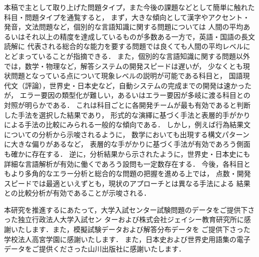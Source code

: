 \documentclass[japanese]{jnlp_1.4b}
\begin{document}
本稿で主として取り上げた問題タイプ，また今後の課題などとして簡単に触れた科目・問題タイプを通覧すると，
まず，大きな傾向として漢字やアクセント・発音，文法問題など，個別的な言語知識に関する問題については
人間の平均あるいはそれ以上の精度を達成しているものが多数ある一方で，英語・国語の長文読解に
代表される総合的な能力を要する問題では良くても人間の平均レベルにとどまっていることが指摘できる．
また，個別的な言語知識に関する問題以外では，数学・物理など，解答システムの開発スピードは遅いが，
少なくとも現状問題となっている点について現象レベルの説明が可能である科目と，
国語現代文（評論），世界史・日本史など，自動システムの完成までの開発は速かったが，
エラー要因の類型化が難しい，あるいはエラー要因が多岐に渡る科目との対照が明らかである．
これは科目ごとに各開発チームが最も有効であると判断した手法を選択した結果であり，
形式的な演繹に基づく手法と表層的手がかりによる手法の比較にみられる一般的な傾向である．
しかし，例えば行為結果文についての分析から示唆されるように，
数学においても出現する構文パターンに大きな偏りがあるなど，
表層的な手がかりに基づく手法が有効であろう側面も確かに存在する．
逆に，分析結果から示されたように，世界史・日本史にも詳細な言語解析が有効に働くであろう設問も一定数存在する．
今後，各科目ともより多角的なエラー分析と総合的な問題の把握を進める上では，
点数・開発スピードでは最適といえずとも，現状のアプローチとは異なる手法による
結果との比較分析が有効であることが示唆される．





\acknowledgment

本研究を推進するにあたって，大学入試センター試験問題のデータをご提供下さった独立行政法人大学入試セン
ターおよび株式会社ジェイシー教育研究所に感謝いたします．また，模擬試験データおよび解答分布データを
ご提供下さった学校法人高宮学園に感謝いたします．
また，日本史および世界史用語集の電子データをご提供くださった山川出版社に感謝いたします．
\end{document}
